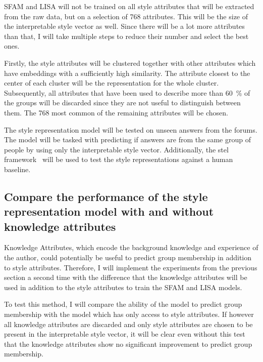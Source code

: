 SFAM and LISA will not be trained on all style attributes that will be extracted from the raw data, but on a selection of 768 attributes. This will be the size of the interpretable style vector as well. Since there will be a lot more attributes than that, I will take multiple steps to reduce their number and select the best ones.

Firstly, the style attributes will be clustered together with other attributes which have embeddings with a sufficiently high similarity. The attribute closest to the center of each cluster will be the representation for the whole cluster. Subsequently, all attributes that have been used to describe more than \SI{60}{\percent} of the groups will be discarded since they are not useful to distinguish between them. %
The 768 most common of the remaining attributes will be chosen.

The style representation model will be tested on unseen answers from the forums. The model will be tasked with predicting if answers are from the same group of people by using only the interpretable style vector. Additionally, the \ac{stel} framework~\cite{wegmann-nguyen-2021-capture} will be used to test the style representations against a human baseline.


\subsection{Compare the performance of the style representation model with and without knowledge attributes}
Knowledge Attributes, which encode the background knowledge and experience of the author, could potentially be useful to predict group membership in addition to style attributes. Therefore, I will implement the experiments from the previous section a second time with the difference that the knowledge attributes will be used in addition to the style attributes to train the SFAM and LISA models.

To test this method, I will compare the ability of the model to predict group membership with the model which has only access to style attributes. If however all knowledge attributes are discarded and only style attributes are chosen to be present in the interpretable style vector, it will be clear even without this test that the knowledge attributes show no significant improvement to predict group membership.


